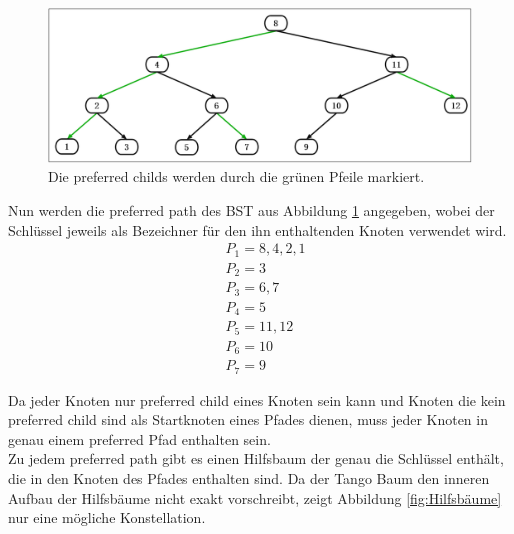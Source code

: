 \documentclass[a4paper,12pt]{article}
\begin{document}
\begin{figure}[h]
	\centering
	\includegraphics[width=1\textwidth]{"Medien/Tango/prefChilds"}
	\caption{Die preferred childs werden durch die grünen Pfeile markiert. }
	\label{fig:prefChilds}
\end{figure}

\noindent Nun werden die preferred path des BST aus Abbildung \ref{fig:prefChilds} angegeben, wobei der Schlüssel jeweils als Bezeichner für den ihn enthaltenden Knoten verwendet wird.
\begin{align*}
&P_1 = 8, 4, 2,1 \\
&P_2 = 3 \\
&P_3 = 6, 7 \\
&P_4 = 5 \\
&P_5 = 11, 12 \\
&P_6 = 10 \\
&P_7 = 9
\end{align*}

\noindent Da jeder Knoten nur preferred child eines Knoten sein kann und Knoten die kein preferred child sind als Startknoten eines Pfades dienen, muss jeder Knoten in genau einem preferred Pfad enthalten sein.\\
Zu jedem preferred path gibt es einen Hilfsbaum der genau die Schlüssel enthält, die in den Knoten des Pfades enthalten sind. Da der Tango Baum den inneren Aufbau der Hilfsbäume nicht exakt vorschreibt, zeigt Abbildung \ref{fig:Hilfsbäume} nur eine mögliche Konstellation.
\end{document}
